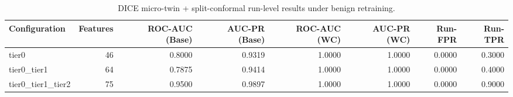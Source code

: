 \begin{table}[t]
\centering
\caption{DICE micro-twin + split-conformal run-level results under benign retraining.}
\label{tab:dice_full_overall}
\footnotesize
\begin{tabular}{lrrrrrrr}
\toprule
Configuration & Features & ROC-AUC (Base) & AUC-PR (Base) & ROC-AUC (WC) & AUC-PR (WC) & Run-FPR & Run-TPR \\
\midrule
tier0 & 46 & 0.8000 & 0.9319 & 1.0000 & 1.0000 & 0.0000 & 0.3000 \\
tier0_tier1 & 64 & 0.7875 & 0.9414 & 1.0000 & 1.0000 & 0.0000 & 0.4000 \\
tier0_tier1_tier2 & 75 & 0.9500 & 0.9897 & 1.0000 & 1.0000 & 0.0000 & 0.9000 \\
\bottomrule
\end{tabular}

\end{table}

